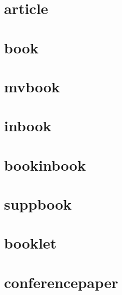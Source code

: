\documentclass[a4paper]{article}
\begin{document}
\section{article}

\cite[1]{article}

\cite[1]{article}

\section{book}

\cite[1]{book}

\cite[1]{book}

\section{mvbook}

\cite[1]{mvbook}

\cite[1]{mvbook}

\section{inbook}

\cite[1]{inbook}

\cite[1]{inbook}

\section{bookinbook}

\cite[1]{bookinbook}

\cite[1]{bookinbook}

\section{suppbook}

\cite[1]{suppbook}

\cite[1]{suppbook}

\section{booklet}

\cite[1]{booklet}

\cite[1]{booklet}

\section{conferencepaper}

\cite[1]{conferencepaper}
\end{document}
